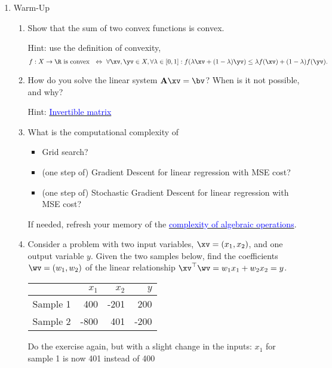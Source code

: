 \documentclass{../tex_import/ETHuebung_english}
\begin{document}
\begin{enumerate}
	\item Warm-Up

  \begin{enumerate}
	  \item Show that the sum of two convex functions is convex.

    Hint: use the definition of convexity,
		\[
		f : X \rightarrow \R
		\text{ is convex }
		\ \Leftrightarrow\
		\forall \xv, \yv \in X, \forall \lambda \in [0,1] :
		f(\lambda \xv + (1-\lambda)\yv) \leq \lambda f(\xv) + (1-\lambda)f(\yv).
		\]

  	\item How do you solve the linear system $\mathbf{A}\xv = \bv$? When is it not possible, and why?

  		Hint: \href{https://en.wikipedia.org/wiki/Invertible_matrix}{\textcolor{blue}{Invertible matrix}}
  	\item What is the computational complexity of
	\begin{itemize}
	\item Grid search?
	\item (one step of) Gradient Descent for linear regression with MSE cost?
	\item (one step of) Stochastic Gradient Descent for linear regression with MSE cost?
	\end{itemize}
    	If needed, refresh your memory of the \href{https://en.wikipedia.org/wiki/Computational_complexity_of_mathematical_operations\#Matrix_algebra}{\textcolor{blue}{complexity of algebraic operations}}.
		\item Consider a problem with two input variables, $\xv=(x_1,x_2)$, and one output variable $y$.
			Given the two samples below, find the coefficients $\wv=(w_1,w_2)$ of the linear relationship $\xv^\top\wv = w_1 x_1 + w_2 x_2 = y$.

			\begin{center}
				\begin{tabular}{r|rrr}
					          & $x_1$ & $x_2$ &  $y$	\\
					\hline
					Sample 1  &   400 &  -201 &  200	\\
					Sample 2  &  -800 &   401 & -200	\\
				\end{tabular}
			\end{center}

			Do the exercise again, but with a slight change in the inputs: $x_1$ for sample 1 is now 401 instead of 400


\end{enumerate}
\end{enumerate}
\end{document}
